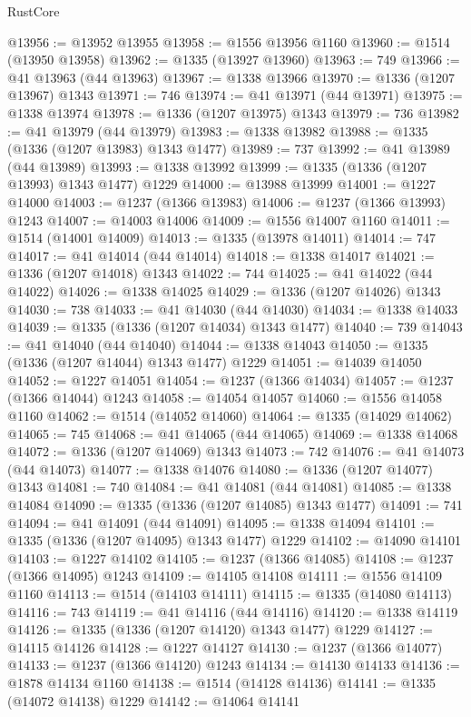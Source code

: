 \begin{lexlean}{RustCore}
\begin{coremodule}
@13956 := @13952 @13955
@13958 := @1556 @13956 @1160
@13960 := @1514 (@13950 @13958)
@13962 := @1335 (@13927 @13960)
@13963 := 749
@13966 := @41 @13963 (@44 @13963)
@13967 := @1338 @13966
@13970 := @1336 (@1207 @13967) @1343
@13971 := 746
@13974 := @41 @13971 (@44 @13971)
@13975 := @1338 @13974
@13978 := @1336 (@1207 @13975) @1343
@13979 := 736
@13982 := @41 @13979 (@44 @13979)
@13983 := @1338 @13982
@13988 := @1335 (@1336 (@1207 @13983) @1343 @1477)
@13989 := 737
@13992 := @41 @13989 (@44 @13989)
@13993 := @1338 @13992
@13999 := @1335 (@1336 (@1207 @13993) @1343 @1477) @1229
@14000 := @13988 @13999
@14001 := @1227 @14000
@14003 := @1237 (@1366 @13983)
@14006 := @1237 (@1366 @13993) @1243
@14007 := @14003 @14006
@14009 := @1556 @14007 @1160
@14011 := @1514 (@14001 @14009)
@14013 := @1335 (@13978 @14011)
@14014 := 747
@14017 := @41 @14014 (@44 @14014)
@14018 := @1338 @14017
@14021 := @1336 (@1207 @14018) @1343
@14022 := 744
@14025 := @41 @14022 (@44 @14022)
@14026 := @1338 @14025
@14029 := @1336 (@1207 @14026) @1343
@14030 := 738
@14033 := @41 @14030 (@44 @14030)
@14034 := @1338 @14033
@14039 := @1335 (@1336 (@1207 @14034) @1343 @1477)
@14040 := 739
@14043 := @41 @14040 (@44 @14040)
@14044 := @1338 @14043
@14050 := @1335 (@1336 (@1207 @14044) @1343 @1477) @1229
@14051 := @14039 @14050
@14052 := @1227 @14051
@14054 := @1237 (@1366 @14034)
@14057 := @1237 (@1366 @14044) @1243
@14058 := @14054 @14057
@14060 := @1556 @14058 @1160
@14062 := @1514 (@14052 @14060)
@14064 := @1335 (@14029 @14062)
@14065 := 745
@14068 := @41 @14065 (@44 @14065)
@14069 := @1338 @14068
@14072 := @1336 (@1207 @14069) @1343
@14073 := 742
@14076 := @41 @14073 (@44 @14073)
@14077 := @1338 @14076
@14080 := @1336 (@1207 @14077) @1343
@14081 := 740
@14084 := @41 @14081 (@44 @14081)
@14085 := @1338 @14084
@14090 := @1335 (@1336 (@1207 @14085) @1343 @1477)
@14091 := 741
@14094 := @41 @14091 (@44 @14091)
@14095 := @1338 @14094
@14101 := @1335 (@1336 (@1207 @14095) @1343 @1477) @1229
@14102 := @14090 @14101
@14103 := @1227 @14102
@14105 := @1237 (@1366 @14085)
@14108 := @1237 (@1366 @14095) @1243
@14109 := @14105 @14108
@14111 := @1556 @14109 @1160
@14113 := @1514 (@14103 @14111)
@14115 := @1335 (@14080 @14113)
@14116 := 743
@14119 := @41 @14116 (@44 @14116)
@14120 := @1338 @14119
@14126 := @1335 (@1336 (@1207 @14120) @1343 @1477) @1229
@14127 := @14115 @14126
@14128 := @1227 @14127
@14130 := @1237 (@1366 @14077)
@14133 := @1237 (@1366 @14120) @1243
@14134 := @14130 @14133
@14136 := @1878 @14134 @1160
@14138 := @1514 (@14128 @14136)
@14141 := @1335 (@14072 @14138) @1229
@14142 := @14064 @14141

\end{coremodule}
\end{lexlean}
